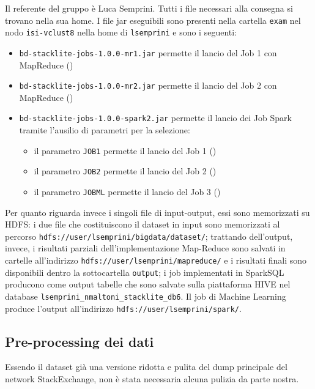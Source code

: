 \documentclass[
  a4paper,            %
  10pt                %
]{article}
\begin{document}
  Il referente del gruppo è Luca Semprini.
  Tutti i file necessari alla consegna si trovano nella sua home.
  I file jar eseguibili sono presenti nella cartella \texttt{exam} nel nodo \texttt{isi-vclust8} nella home di \texttt{lsemprini} e sono i seguenti:
  \begin{itemize}
    \item
      \texttt{bd-stacklite-jobs-1.0.0-mr1.jar} permette il lancio del Job 1 con MapReduce ()
    \item
      \texttt{bd-stacklite-jobs-1.0.0-mr2.jar} permette il lancio del Job 2 con MapReduce ()
    \item
      \texttt{bd-stacklite-jobs-1.0.0-spark2.jar} permette il lancio dei Job Spark tramite l'ausilio di parametri per la selezione:
      \begin{itemize}
        \item il parametro \texttt{JOB1} permette il lancio del Job 1 ()
        \item il parametro \texttt{JOB2} permette il lancio del Job 2 ()
        \item il parametro \texttt{JOBML} permette il lancio del Job 3 ()
      \end{itemize}
  \end{itemize}

  Per quanto riguarda invece i singoli file di input-output, essi sono memorizzati su HDFS\@:
  i due file che costituiscono il dataset in input sono memorizzati al percorso \texttt{hdfs://user/lsemprini/bigdata/dataset/};
  trattando dell'output, invece, i risultati parziali dell'implementazione Map-Reduce sono salvati in cartelle all'indirizzo \texttt{hdfs://user/lsemprini/mapreduce/}
  e i risultati finali sono disponibili dentro la sottocartella \texttt{output};
  i job implementati in SparkSQL producono come output tabelle che sono salvate sulla piattaforma HIVE nel database \texttt{lsemprini\_nmaltoni\_stacklite\_db6}.
  Il job di Machine Learning produce l'output all'indirizzo \texttt{hdfs://user/lsemprini/spark/}.

  \subsection{Pre-processing dei dati}\label{subsec:preprocessing}

  Essendo il dataset già una versione ridotta e pulita del dump principale del network StackExchange, non è stata necessaria alcuna pulizia da parte nostra.
\end{document}

